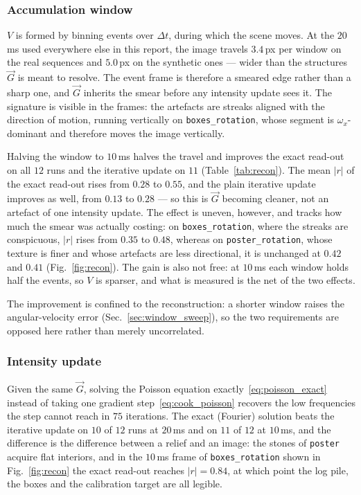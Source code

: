 \documentclass[journal]{IEEEtran}
\newcommand{\Vmap}{V}
\newcommand{\Gmap}{\vec{G}}
\begin{document}
\subsubsection{Accumulation window}
$\Vmap$ is formed by binning events over $\Delta t$, during which the scene
moves. At the $20$\,ms used everywhere else in this report, the image travels
$3.4$\,px per window on the real sequences and $5.0$\,px on the synthetic ones
--- wider than the structures $\Gmap$ is meant to resolve. The event frame is
therefore a smeared edge rather than a sharp one, and $\Gmap$ inherits the
smear before any intensity update sees it. The signature is visible in the
frames: the artefacts are streaks aligned with the direction of motion, running
vertically on \texttt{boxes\_rotation}, whose segment is $\omega_x$-dominant and
therefore moves the image vertically.

Halving the window to $10$\,ms halves the travel and improves the exact
read-out on all $12$ runs and the iterative update on $11$
(Table~\ref{tab:recon}). The mean $|r|$ of the exact read-out rises from $0.28$
to $0.55$, and the plain iterative update improves as well, from $0.13$ to
$0.28$ --- so this is $\Gmap$ becoming cleaner,
not an artefact of one intensity update. The effect is uneven, however, and
tracks how much the smear was actually costing: on \texttt{boxes\_rotation},
where the streaks are conspicuous, $|r|$ rises from $0.35$ to $0.48$, whereas on
\texttt{poster\_rotation}, whose texture is finer and whose artefacts are less
directional, it is unchanged at $0.42$ and $0.41$ (Fig.~\ref{fig:recon}). The
gain is also not free: at $10$\,ms each window holds half the events, so $\Vmap$
is sparser, and what is measured is the net of the two effects.

The improvement is confined to the reconstruction: a shorter window raises the
angular-velocity error (Sec.~\ref{sec:window_sweep}), so the two requirements
are opposed here rather than merely uncorrelated.

\subsubsection{Intensity update}
Given the same $\Gmap$, solving the Poisson equation
exactly~\eqref{eq:poisson_exact} instead of taking one gradient
step~\eqref{eq:cook_poisson} recovers the low frequencies the step cannot reach
in $75$ iterations. The exact (Fourier) solution beats the iterative update on
$10$ of $12$ runs at $20$\,ms and on $11$ of $12$ at $10$\,ms, and the
difference is the difference between a relief and an image: the stones of
\texttt{poster} acquire flat interiors, and in the $10$\,ms frame of
\texttt{boxes\_rotation} shown in Fig.~\ref{fig:recon} the exact read-out
reaches $|r|=0.84$, at which point the log pile, the boxes and the calibration
target are all legible.
\end{document}

